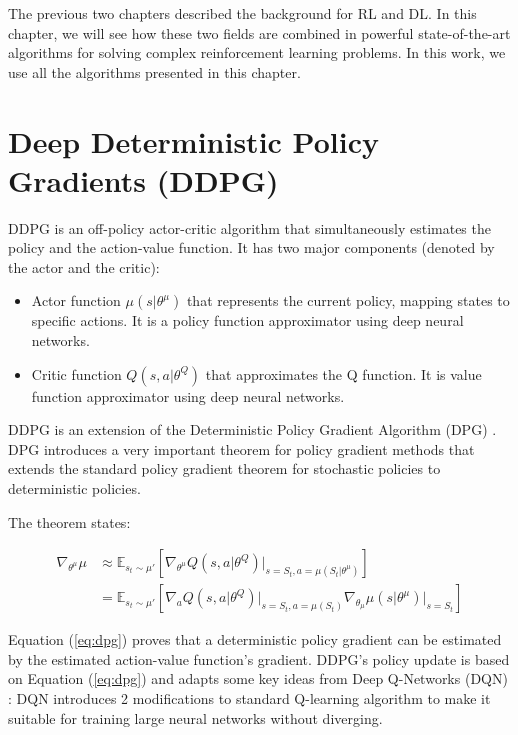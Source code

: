 The previous two chapters described the background for RL and DL. In this chapter, we will see 
how these two fields are combined in powerful state-of-the-art algorithms for solving complex reinforcement learning problems.
In this work, we use all the algorithms presented in this chapter.

\section{Deep Deterministic Policy Gradients (DDPG)}

DDPG \cite{DDPG} is an off-policy actor-critic algorithm that simultaneously estimates the policy and the action-value function.
It has two major components (denoted by the actor and the critic):

\begin{itemize}
    \item Actor function $\mu(s \vert \theta^\mu) $ that represents the current policy, mapping states to specific actions.
     It is a policy function approximator using deep neural networks.
    \item Critic function $ Q(s, a \vert \theta^Q)$ that approximates the Q function. 
    It is value function approximator using deep neural networks.
\end{itemize}

DDPG is an extension of the Deterministic Policy Gradient Algorithm (DPG) \cite{DPG}. 
DPG introduces a very important theorem for policy gradient methods that extends the standard policy gradient
theorem for stochastic policies to deterministic policies.

The theorem states: 


\begin{equation}
\begin{split}
    \nabla_{\theta^\mu} \mu
        & \approx \mathbb{E}_{s_t \sim \mu'}
                [\nabla_{\theta^\mu} Q(s, a \vert \theta^Q)\vert_{s=S_t,a=\mu(S_t \vert \theta^\mu)}]  \\
        & = \mathbb{E}_{s_t \sim \mu'}
                [\nabla_a Q(s, a \vert \theta^Q)\vert_{s=S_t,a=\mu(S_t)}
                \nabla_{\theta_\mu}\mu(s\vert\theta^\mu)\vert_{s=S_t}]
\end{split}
\label{eq:dpg}
\end{equation}

Equation (\ref{eq:dpg}) proves that a deterministic policy gradient can be estimated by the estimated
action-value function's gradient.
DDPG's policy update is based on Equation (\ref{eq:dpg}) and adapts some key ideas from Deep Q-Networks (DQN) \cite{RLNature2015}:
DQN introduces 2 modifications to standard Q-learning algorithm to make it suitable for training
large neural networks without diverging.

